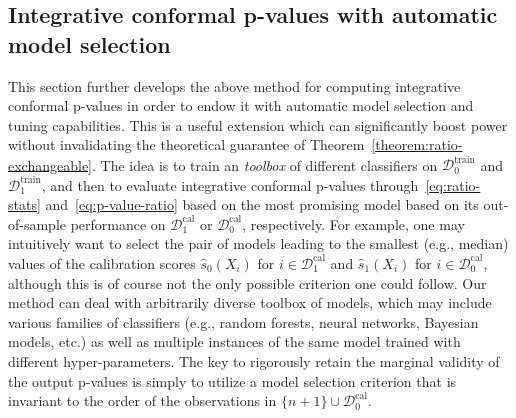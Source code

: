 \documentclass[11pt]{article}
\begin{document}
\subsection{Integrative conformal p-values with automatic model selection} \label{sec:auto-tuning}


This section further develops the above method for computing integrative conformal p-values in order to endow it with automatic model selection and tuning capabilities.
This is a useful extension which can significantly boost power without invalidating the theoretical guarantee of Theorem~\ref{theorem:ratio-exchangeable}.
The idea is to train an {\em toolbox} of different classifiers on $\mathcal{D}_0^{\mathrm{train}}$ and $\mathcal{D}_1^{\mathrm{train}}$, and then to evaluate integrative conformal p-values through~\eqref{eq:ratio-stats} and~\eqref{eq:p-value-ratio} based on the most promising model based on its out-of-sample performance on $\mathcal{D}_{1}^{\mathrm{cal}}$ or $\mathcal{D}_{0}^{\mathrm{cal}}$, respectively.
For example, one may intuitively want to select the pair of models leading to the smallest (e.g., median) values of the calibration scores $\hat{s}_0(X_i)$ for $i \in \mathcal{D}_{1}^{\mathrm{cal}}$ and $\hat{s}_1(X_i)$ for $i \in \mathcal{D}_{0}^{\mathrm{cal}}$, although this is of course not the only possible criterion one could follow.
Our method can deal with arbitrarily diverse toolbox of models, which may include various families of classifiers (e.g., random forests, neural networks, Bayesian models, etc.) as well as multiple instances of the same model trained with different hyper-parameters.
The key to rigorously retain the marginal validity of the output p-values is simply to utilize a model selection criterion that is invariant to the order of the observations in $\{n+1\} \cup \mathcal{D}_{0}^{\mathrm{cal}}$.
\end{document}
